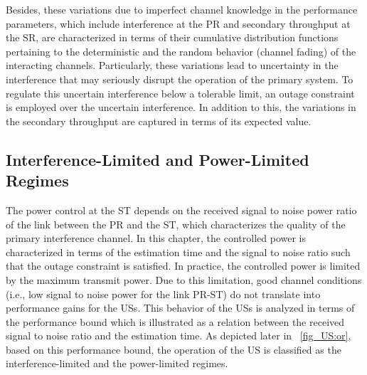 Besides, these variations due to imperfect channel knowledge in the performance parameters, which include interference at the PR and secondary throughput at the SR, are characterized in terms of their cumulative distribution functions pertaining to the deterministic  and the random behavior (channel fading) of the interacting channels. Particularly, these variations lead to uncertainty in the interference that may seriously disrupt the operation of the primary system. To regulate this uncertain interference below a tolerable limit, an outage constraint is employed over the uncertain interference. In addition to this, the variations in the secondary throughput are captured in terms of its expected value.

\subsection{Interference-Limited and Power-Limited Regimes}
The power control at the ST depends on the received signal to noise power ratio of the link between the PR and the ST, which characterizes the quality of the primary interference channel. In this chapter, the controlled power is characterized in terms of the estimation time and the signal to noise ratio such that the outage constraint is satisfied. In practice, the controlled power is limited by the maximum transmit power. Due to this limitation, good channel conditions (i.e., low signal to noise power for the link PR-ST) do not translate into performance gains for the USs. This behavior of the USs is analyzed in terms of the performance bound which is illustrated as a relation between the received signal to noise ratio and the estimation time. As depicted later in \figurename~\ref{fig_US:or}, based on this performance bound, the operation of the US is classified as the interference-limited and the power-limited regimes.

